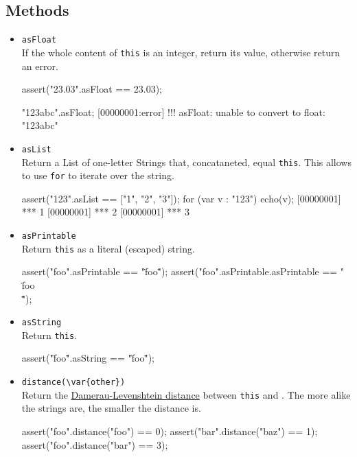 \subsection{Methods}
\begin{itemize}
\item \lstinline|asFloat|\\
  If the whole content of \lstinline|this| is an integer, return its
  value, otherwise return an error.
\begin{urbiscript}[firstnumber=last]
assert("23.03".asFloat == 23.03);

"123abc".asFloat;
[00000001:error] !!! asFloat: unable to convert to float: "123abc"
\end{urbiscript}

\item \lstinline|asList|\\
  Return a List of one-letter Strings that, concataneted, equal
  \lstinline|this|.  This allows to use \lstinline|for| to iterate
  over the string.
\begin{urbiscript}[firstnumber=last]
assert("123".asList == ["1", "2", "3"]);
for (var v : "123")
  echo(v);
[00000001] *** 1
[00000001] *** 2
[00000001] *** 3
\end{urbiscript}

\item \lstinline|asPrintable|\\
  Return \lstinline|this| as a literal (escaped) string.
\begin{urbiscript}[firstnumber=last]
assert("foo".asPrintable == "\"foo\"");
assert("foo".asPrintable.asPrintable == "\"\\\"foo\\\"\"");
\end{urbiscript}

\item \lstinline|asString|\\
  Return \lstinline|this|.
\begin{urbiscript}[firstnumber=last]
assert("\"foo\"".asString == "\"foo\"");
\end{urbiscript}

\item \lstinline|distance(\var{other})|\\
  Return the
  \href{http://en.wikipedia.org/wiki/Damerau-Levenshtein_distance}
  {Damerau-Levenshtein distance} between \lstinline|this| and
  .  The more alike the strings are, the smaller the
  distance is.
\begin{urbiscript}[firstnumber=last]
assert("foo".distance("foo") == 0);
assert("bar".distance("baz") == 1);
assert("foo".distance("bar") == 3);
\end{urbiscript}


\end{itemize}
